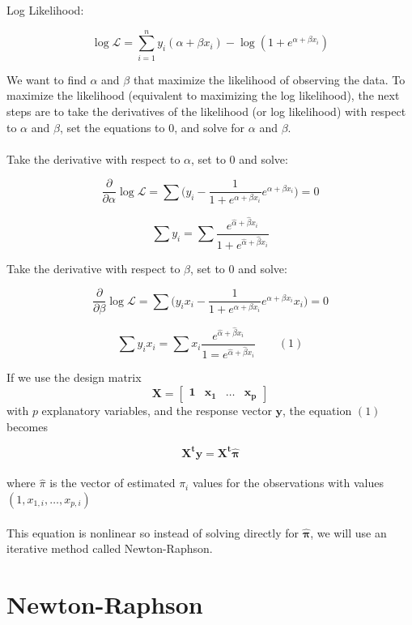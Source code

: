\documentclass[12pt,timesnewroman,letterpaper]{article}
\begin{document}
\noindent Log Likelihood:

$$\log \mathscr{L} = \sum_{i=1}^n y_i(\alpha + \beta x_i) - \log(1 + e^{\alpha + \beta x_i})$$

\noindent We want to find $\alpha$ and $\beta$ that maximize the likelihood of observing the data. To maximize the likelihood (equivalent to maximizing the log likelihood), the next steps are to take the derivatives of the likelihood (or log likelihood) with respect to $\alpha$ and $\beta$, set the equations to $0$, and solve for $\alpha$ and $\beta$.\\\\

\noindent Take the derivative with respect to $\alpha$, set to $0$ and solve:

$$
\dfrac{\partial}{\partial \alpha} \log \mathscr{L} = \sum \big(y_i - \dfrac{1}{1 + e^{\alpha + \beta x_i}}e^{\alpha + \beta x_i}\big) = 0
$$

$$
\sum y_i = \sum \dfrac{e^{\hat{\alpha} + \hat{\beta}x_i}}{1 + e^{\hat{\alpha} + \hat{\beta}x_i}}
$$

\noindent Take the derivative with respect to $\beta$, set to $0$ and solve:

$$
\dfrac{\partial}{\partial \beta} \log \mathscr{L} = \sum \big(y_i x_i - \dfrac{1}{1 + e^{\alpha + \beta x_i}}e^{\alpha + \beta x_i}x_i\big) = 0
$$

$$
\sum y_i x_i = \sum x_i \dfrac{e^{\hat{\alpha} + \hat{\beta} x_i}}{1 = e^{\hat{\alpha} + \hat{\beta} x_i}} \quad \quad (1)
$$

\noindent If we use the design matrix
$$
\boldsymbol{X} = \begin{bmatrix}
    \boldsymbol{1}       & \boldsymbol{x_1} & \dots & \boldsymbol{x_p}
\end{bmatrix}
$$
with $p$ explanatory variables, and the response vector $\boldsymbol{y}$, the equation $(1)$ becomes

$$
\boldsymbol{X^t y} = \boldsymbol{X^t \hat{\pi}}
$$
\\
where $\hat{\pi}$ is the vector of estimated $\pi_i$ values for the observations with values $(1, x_{1,i}, \ldots, x_{p,i})$ 
\\\\
This equation is nonlinear so instead of solving directly for $\boldsymbol{\hat{\pi}}$, we will use an iterative method called Newton-Raphson.

\section{Newton-Raphson}
\end{document}
